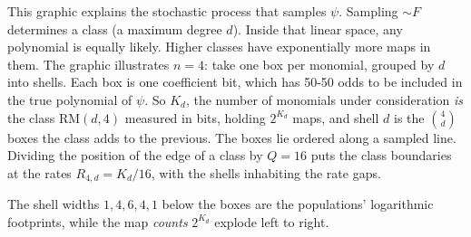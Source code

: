 \documentclass[11pt]{article}
\begin{document}
\begin{example}
  This graphic explains the stochastic process that samples $\psi$. 
  Sampling $\sim F$ determines a class (a maximum degree $d$). Inside that linear space, any polynomial is equally likely.
  Higher classes have exponentially more maps in them.
The graphic illustrates $n = 4$: take one box per monomial, grouped by $d$ into shells. Each box is one coefficient bit, which has
50-50 odds to be included in the true polynomial of $\psi$.
So $K_d$, the number of monomials under consideration
\emph{is} the class $\mathrm{RM}(d,4)$ measured in bits, holding
$2^{K_d}$ maps, and shell $d$ is the $\binom 4d$ boxes the class
adds to the previous. The boxes lie ordered along a sampled line. 
Dividing the position of the edge of a class by
$Q = 16$ puts the class boundaries at the rates $R_{4,d} = K_d/16$,
with the shells inhabiting the rate gaps. 

The shell widths
$1, 4, 6, 4, 1$ below the boxes are the populations' logarithmic footprints, while
the map \emph{counts} $2^{K_d}$ explode left to right.


\end{example}
\end{document}
